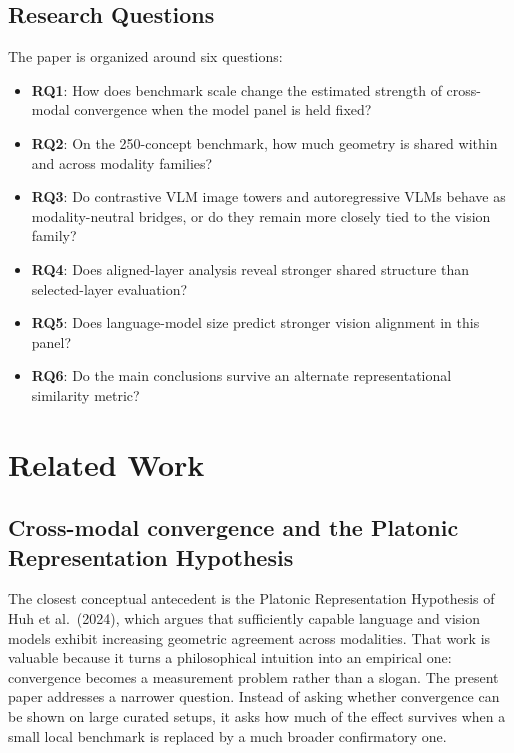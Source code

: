 \documentclass[11pt,a4paper]{article}
\providecommand{\tightlist}{%
  \setlength{\itemsep}{0pt}\setlength{\parskip}{0pt}}
\begin{document}
\subsection{Research Questions}\label{research-questions}

The paper is organized around six questions:

\begin{itemize}
\tightlist
\item
  \textbf{RQ1}: How does benchmark scale change the estimated strength
  of cross-modal convergence when the model panel is held fixed?
\item
  \textbf{RQ2}: On the 250-concept benchmark, how much geometry is
  shared within and across modality families?
\item
  \textbf{RQ3}: Do contrastive VLM image towers and autoregressive VLMs
  behave as modality-neutral bridges, or do they remain more closely
  tied to the vision family?
\item
  \textbf{RQ4}: Does aligned-layer analysis reveal stronger shared
  structure than selected-layer evaluation?
\item
  \textbf{RQ5}: Does language-model size predict stronger vision
  alignment in this panel?
\item
  \textbf{RQ6}: Do the main conclusions survive an alternate
  representational similarity metric?
\end{itemize}

\section{Related Work}\label{related-work}

\subsection{Cross-modal convergence and the Platonic Representation
Hypothesis}\label{cross-modal-convergence-and-the-platonic-representation-hypothesis}

The closest conceptual antecedent is the Platonic Representation
Hypothesis of Huh et al.~(2024), which argues that sufficiently capable
language and vision models exhibit increasing geometric agreement across
modalities. That work is valuable because it turns a philosophical
intuition into an empirical one: convergence becomes a measurement
problem rather than a slogan. The present paper addresses a narrower
question. Instead of asking whether convergence can be shown on large
curated setups, it asks how much of the effect survives when a small
local benchmark is replaced by a much broader confirmatory one.
\end{document}
